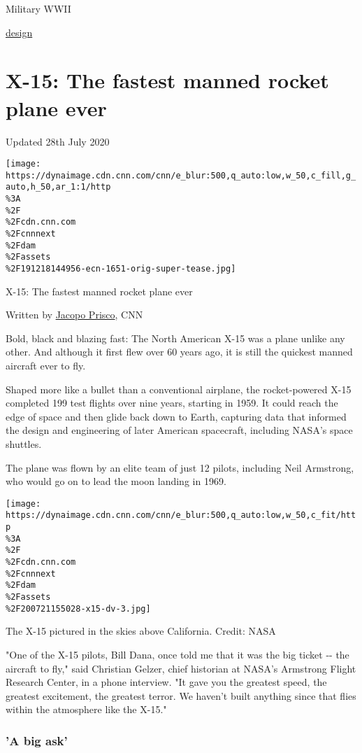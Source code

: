\href{/}{}\href{/style}{}

Military WWII

\href{/style/design}{design}

\hypertarget{x-15-the-fastest-manned-rocket-plane-ever}{%
\section{X-15: The fastest manned rocket plane
ever}\label{x-15-the-fastest-manned-rocket-plane-ever}}

Updated 28th July 2020

\texttt{[image: https://dynaimage.cdn.cnn.com/cnn/e\_blur:500,q\_auto:low,w\_50,c\_fill,g\_auto,h\_50,ar\_1:1/http\\\%3A\\\%2F\\\%2Fcdn.cnn.com\\\%2Fcnnnext\\\%2Fdam\\\%2Fassets\\\%2F191218144956-ecn-1651-orig-super-tease.jpg]}

X-15: The fastest manned rocket plane ever

Written by \href{/profiles/jacopo-prisco}{Jacopo Prisco}, CNN

Bold, black and blazing fast: The North American X-15 was a plane unlike
any other. And although it first flew over 60 years ago, it is still the
quickest manned aircraft ever to fly.

Shaped more like a bullet than a conventional airplane, the
rocket-powered X-15 completed 199 test flights over nine years, starting
in 1959. It could reach the edge of space and then glide back down to
Earth, capturing data that informed the design and engineering of later
American spacecraft, including NASA's space shuttles.

The plane was flown by an elite team of just 12 pilots, including Neil
Armstrong, who would go on to lead the moon landing in 1969.

\texttt{[image: https://dynaimage.cdn.cnn.com/cnn/e\_blur:500,q\_auto:low,w\_50,c\_fit/http\\\%3A\\\%2F\\\%2Fcdn.cnn.com\\\%2Fcnnnext\\\%2Fdam\\\%2Fassets\\\%2F200721155028-x15-dv-3.jpg]}

The X-15 pictured in the skies above California. Credit: NASA

"One of the X-15 pilots, Bill Dana, once told me that it was the big
ticket -\/- the aircraft to fly," said Christian Gelzer, chief historian
at NASA's Armstrong Flight Research Center, in a phone interview. "It
gave you the greatest speed, the greatest excitement, the greatest
terror. We haven't built anything since that flies within the atmosphere
like the X-15."

\hypertarget{a-big-ask}{%
\subsubsection{'A big ask'}\label{a-big-ask}}

